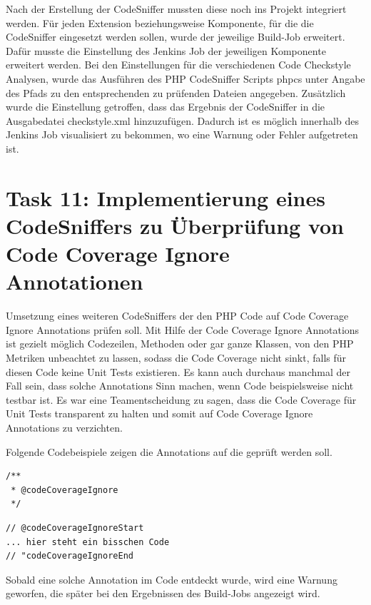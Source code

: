 \documentclass[11pt,a4paper]{article} %
\begin{document}
Nach der Erstellung der CodeSniffer mussten diese noch ins Projekt integriert werden.
Für jeden Extension beziehungsweise Komponente, für die die CodeSniffer eingesetzt werden sollen,
wurde der jeweilige Build-Job erweitert. Dafür musste die Einstellung des Jenkins Job der jeweiligen 
Komponente erweitert werden. Bei den Einstellungen für die verschiedenen Code Checkstyle Analysen,
wurde das Ausführen des PHP CodeSniffer Scripts phpcs unter Angabe des Pfads zu den entsprechenden zu
prüfenden Dateien angegeben. Zusätzlich wurde die Einstellung getroffen, dass das Ergebnis der CodeSniffer
in die Ausgabedatei checkstyle.xml hinzuzufügen. Dadurch ist es möglich innerhalb des Jenkins Job
visualisiert zu bekommen, wo eine Warnung oder Fehler aufgetreten ist.



\section{Task 11: Implementierung eines CodeSniffers zu Überprüfung von Code Coverage Ignore Annotationen}

Umsetzung eines weiteren CodeSniffers der den PHP Code auf Code Coverage Ignore Annotations prüfen soll.
Mit Hilfe der Code Coverage Ignore Annotations ist gezielt möglich Codezeilen, Methoden oder gar ganze 
Klassen, von den PHP Metriken unbeachtet zu lassen, sodass die Code Coverage nicht sinkt, falls für
diesen Code keine Unit Tests existieren. 
Es kann auch durchaus manchmal der Fall sein, dass solche Annotations Sinn machen, wenn Code beispielsweise
nicht testbar ist. Es war eine Teamentscheidung zu sagen, dass die Code Coverage für Unit Tests transparent zu
halten und somit auf Code Coverage Ignore Annotations zu verzichten.

Folgende Codebeispiele zeigen die Annotations auf die geprüft werden soll.

\begin{lstlisting} 
/**
 * @codeCoverageIgnore
 */
\end{lstlisting} 

\begin{lstlisting} 
// @codeCoverageIgnoreStart
... hier steht ein bisschen Code
// "codeCoverageIgnoreEnd
\end{lstlisting} 

Sobald eine solche Annotation im Code entdeckt wurde, wird eine Warnung geworfen, die später bei den Ergebnissen des Build-Jobs angezeigt wird.
\end{document}
